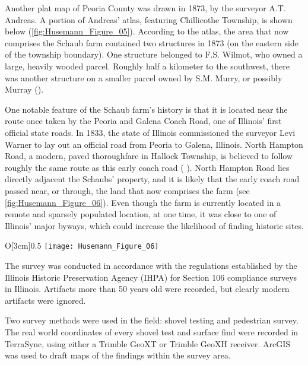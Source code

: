 Another plat map of Peoria County was drawn in 1873, by the surveyor A.T. Andreas. A portion of Andreas’ atlas, featuring Chillicothe Township, is shown below (\cref{fig:Husemann_Figure_05}). According to the atlas, the area that now comprises the Schaub farm contained two structures in 1873 (on the eastern side of the township boundary). One structure belonged to F.S. Wilmot, who owned a large, heavily wooded parcel. Roughly half a kilometer to the southwest, there was another structure on a smaller parcel owned by S.M. Murry, or possibly Murray (\cite{andreas1873}).



One notable feature of the Schaub farm’s history is that it is located near the route once taken by the Peoria and Galena Coach Road, one of Illinois’ first official state roads. In 1833, the state of Illinois commissioned the surveyor Levi Warner to lay out an official road from Peoria to Galena, Illinois. North Hampton Road, a modern, paved thoroughfare in Hallock Township, is believed to follow roughly the same route as this early coach road (\cite{illinois94} %
).
North Hampton Road lies directly adjacent the Schaubs’ property, and it is likely that the early coach road passed near, or through, the land that now comprises the farm (see \cref{fig:Husemann_Figure_06}). Even though the farm is currently located in a remote and sparsely populated location, at one time, it was close to one of Illinois’ major byways, which could increase the likelihood of finding historic sites.

\begin{wrapfigure}{O}[3cm]{0.5\textwidth}
	\texttt{[image: Husemann\_Figure\_06]}
	\caption{Map of early trail and coach road from Peoria to Galena, Illinois
		{\normalfont\scriptsize \\ \copyright\ by Bradley Husemann
	}}
	\label{fig:Husemann_Figure_06}
\end{wrapfigure}


The survey was conducted in accordance with the regulations established by the Illinois Historic Preservation Agency (IHPA) for Section 106 compliance surveys in Illinois. Artifacts more than 50 years old were recorded, but clearly modern artifacts were ignored.

Two survey methods were used in the field: shovel testing and pedestrian survey. The real world coordinates of every shovel test and surface find were recorded in TerraSync, using either a Trimble GeoXT or Trimble GeoXH receiver. ArcGIS was used to draft maps of the findings within the survey area.

